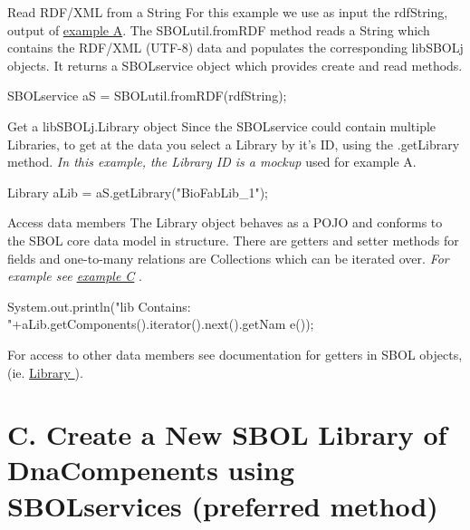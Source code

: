 \begin{DoxyEnumerate}
\item \begin{DoxyParagraph}{Read RDF/XML from a String}
For this example we use as input the rdfString, output of \hyperlink{tutorial_A}{example A}. The SBOLutil.fromRDF method reads a String which contains the RDF/XML (UTF-\/8) data and populates the corresponding libSBOLj objects. It returns a SBOLservice object which provides create and read methods. 
\begin{DoxyCode}
SBOLservice aS = SBOLutil.fromRDF(rdfString);
\end{DoxyCode}

\end{DoxyParagraph}

\item \begin{DoxyParagraph}{Get a libSBOLj.Library object}
Since the SBOLservice could contain multiple Libraries, to get at the data you select a Library by it's ID, using the .getLibrary method. {\itshape In this example, the Library ID is a mockup\/} used for example A. 
\begin{DoxyCode}
Library aLib = aS.getLibrary("BioFabLib_1");
\end{DoxyCode}

\end{DoxyParagraph}

\item \begin{DoxyParagraph}{Access data members}
The Library object behaves as a POJO and conforms to the SBOL core data model in structure. There are getters and setter methods for fields and one-\/to-\/many relations are Collections which can be iterated over. {\itshape For example see \hyperlink{tutorial_C}{example C} \/}. 
\begin{DoxyCode}
System.out.println("lib Contains: "+aLib.getComponents().iterator().next().getNam
      e());
\end{DoxyCode}

\end{DoxyParagraph}
For access to other data members see documentation for getters in SBOL objects, (ie. \hyperlink{}{Library }).
\end{DoxyEnumerate}



 \hypertarget{tutorial_C}{}\section{C. Create a New SBOL Library of DnaCompenents using SBOLservices (preferred method)}\label{tutorial_C}

